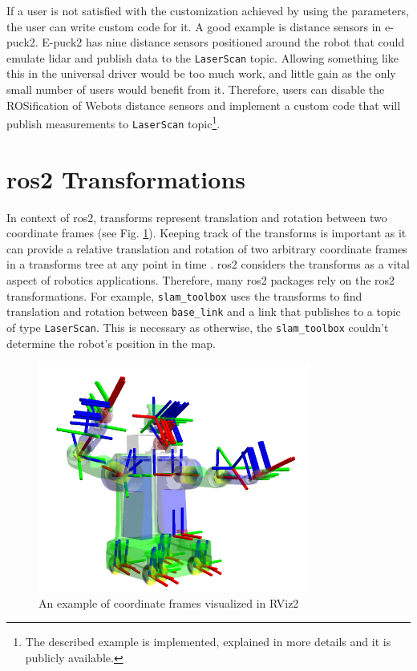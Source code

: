 If a user is not satisfied with the customization achieved by using the parameters, the user can write custom code for it. A good example is distance sensors in e-puck2. E-puck2 has nine distance sensors positioned around the robot that could emulate \ac{lidar} and publish data to the \texttt{LaserScan} topic. Allowing something like this in the universal driver would be too much work, and little gain as the only small number of users would benefit from it. Therefore, users can disable the ROSification of Webots distance sensors and implement a custom code that will publish measurements to \texttt{LaserScan} topic\footnote{The described example is implemented, explained in more details and it is publicly available.}.

\section{\ac{ros2} Transformations}

In context of \ac{ros2}, transforms represent translation and rotation between two coordinate frames (see Fig. \ref{fig:generalization:tf2_robot}). Keeping track of the transforms is important as it can provide a relative translation and rotation of two arbitrary coordinate frames in a transforms tree at any point in time \cite{foote_tf_2013}. \ac{ros2} considers the transforms as a vital aspect of robotics applications. Therefore, many \ac{ros2} packages rely on the \ac{ros2} transformations. For example, \texttt{slam\_toolbox} uses the transforms to find translation and rotation between \texttt{base\_link} and a link that publishes to a topic of type \texttt{LaserScan}. This is necessary as otherwise, the \texttt{slam\_toolbox} couldn't determine the robot's position in the map.

\begin{figure}[H]
    \centering
    \includegraphics[width=0.8\textwidth]{generalization/figures/tf2_robot.png}
    \caption{An example of coordinate frames visualized in RViz2 \cite{foote_tf_2013}}
    \label{fig:generalization:tf2_robot}
\end{figure}

